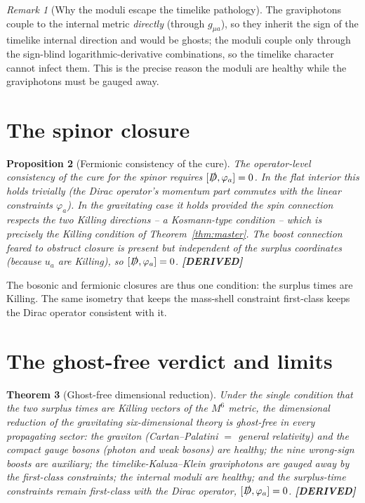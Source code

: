 \documentclass[11pt,oneside]{book}
\newcommand{\Dirac}{\slashed{D}}
\newcommand{\status}[1]{{\sffamily\bfseries\color{statuscol}[#1]}}
\theoremstyle{plain}
\newtheorem{theorem}{Theorem}[chapter]
\newtheorem{proposition}[theorem]{Proposition}
\theoremstyle{definition}
\theoremstyle{remark}
\newtheorem{remark}[theorem]{Remark}
\begin{document}
\begin{remark}[Why the moduli escape the timelike pathology]
The graviphotons couple to the internal metric \emph{directly} (through $g_{\mu a}$),
so they inherit the sign of the timelike internal direction and would be ghosts; the
moduli couple only through the sign-blind logarithmic-derivative combinations, so the
timelike character cannot infect them. This is the precise reason the moduli are
healthy while the graviphotons must be gauged away.
\end{remark}

\section{The spinor closure}
\label{sec:spinor-closure}

\begin{proposition}[Fermionic consistency of the cure]
\label{prop:spinor-closure}
The operator-level consistency of the cure for the spinor requires
$[\Dirac,\varphi_a]=0$. In the flat interior this holds trivially (the Dirac
operator's momentum part commutes with the linear constraints $\varphi_a$). In the
gravitating case it holds provided the spin connection respects the two Killing
directions -- a Kosmann-type condition \cite{Kosmann1971} -- which is precisely the
Killing condition of Theorem~\ref{thm:master}. The boost connection feared to
obstruct closure is present but independent of the surplus coordinates (because
$u_a$ are Killing), so $[\Dirac,\varphi_a]=0$. \status{DERIVED}
\end{proposition}

The bosonic and fermionic closures are thus one condition: the surplus times are
Killing. The same isometry that keeps the mass-shell constraint first-class keeps
the Dirac operator consistent with it.

\section{The ghost-free verdict and limits}
\label{sec:verdict}

\begin{theorem}[Ghost-free dimensional reduction]
\label{thm:ghostfree}
Under the single condition that the two surplus times are Killing vectors of the
$M^6$ metric, the dimensional reduction of the gravitating six-dimensional theory is
ghost-free in every propagating sector: the graviton (Cartan--Palatini $=$ general
relativity) and the compact gauge bosons (photon and weak bosons) are healthy; the
nine wrong-sign boosts are auxiliary; the timelike-Kaluza--Klein graviphotons are
gauged away by the first-class constraints; the internal moduli are healthy; and the
surplus-time constraints remain first-class with the Dirac operator,
$[\Dirac,\varphi_a]=0$. \status{DERIVED}
\end{theorem}
\end{document}
